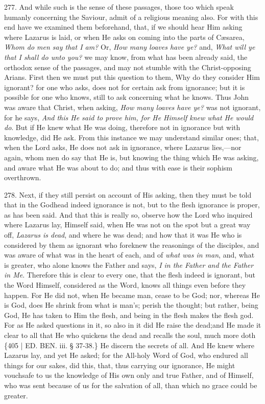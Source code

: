 277.
And while such is the sense of these passages, those too which speak
humanly concerning the Saviour, admit of a religious meaning also. For
with this end have we examined them beforehand, that, if we should
hear Him asking where Lazarus is laid, or when He asks on coming into
the parts of Cæsarea, \emph{Whom do men say that I am?} Or, \emph{How
many loaves have ye?} and, \emph{What will ye that I shall do unto
you?} we may know, from what has been already said, the orthodox
sense of the passages, and may not stumble with the Christ-opposing
Arians. First then we must put this question to them, Why do
they consider Him ignorant? for one who asks, does not for certain ask
from ignorance; but it is possible for one who knows, still to ask
concerning what he knows. Thus John was aware that Christ, when
asking, \emph{How many loaves have ye?} was not ignorant, for he says,
\emph{And this He said to prove him, for He Himself knew what He would do}.
But if He knew what He was doing, therefore not in ignorance but with
knowledge, did He ask. From this instance we may understand similar
ones; that, when the Lord asks, He does not ask in ignorance, where
Lazarus lies,—nor again, whom men do say that He is, but knowing the
thing which He was asking, and aware what He was about to do; and thus
with ease is their sophism overthrown.

278.
Next, if they still persist on account of His asking, then they must
be told that in the Godhead indeed ignorance is not, but to the flesh
ignorance is proper, as has been said. And that this is really so,
observe how the Lord who inquired where Lazarus lay, Himself said,
when He was not on the spot but a great way off, \emph{Lazarus is dead},
and where he was dead; and how that it was He who is considered by
them as ignorant who foreknew the reasonings of the disciples, and was
aware of what was in the heart of each, and of \emph{what was in man},
and, what is greater, who alone knows the Father and says, \emph{I in the
Father and the Father in Me}. Therefore this is clear to every one,
that the flesh indeed is ignorant, but the Word Himself, considered as
the Word, knows all things even before they happen. For He did not,
when He became man, cease to be God; nor, whereas He is God, does He
shrink from what is man's; perish the thought; but rather, being God,
He has taken to Him the flesh, and being in the flesh makes the flesh
god. For as He asked questions in it, so also in it did He raise the
dead;\emph{}and He made it clear to all that He who quickens the dead
and recalls the soul, much more doth \{405 | ED.
BEN.
iii. § 37-38.\} He discern the secrets of all. And He knew where
Lazarus lay, and yet He asked; for the All-holy Word of God, who
endured all things for our sakes, did this, that, thus carrying our
ignorance, He might vouchsafe to us the knowledge of His own only and
true Father, and of Himself, who was sent because of us for the
salvation of all, than which no grace could be greater.

